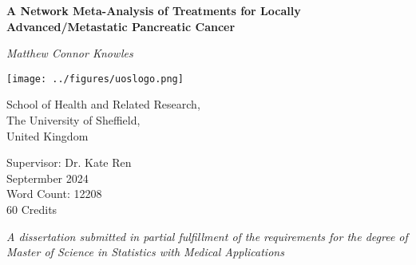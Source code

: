 \begin{titlepage}

    \begin{center}

        \vspace*{1.5cm}

        \textbf{\huge A Network Meta-Analysis of Treatments for Locally Advanced/Metastatic Pancreatic Cancer } 
        
        \vspace*{1.5cm}
        
        \textit{Matthew Connor Knowles}

        \vspace*{1.5cm}
    
        \texttt{[image: ../figures/uoslogo.png]}
        
        \vspace*{1.5cm}
        
        School of Health and Related Research, \\
        The University of Sheffield, \\
        United Kingdom \\

        \vspace*{0.5cm}

        Supervisor: Dr. Kate Ren \\

        Septermber 2024 \\

        Word Count: 12208\\

        60 Credits \\
        
        \vspace*{1.5cm}

        \textit{A dissertation submitted in partial fulfillment of the requirements for the degree of Master of Science in 
        Statistics with Medical Applications}
    \end{center}
    
\end{titlepage}
